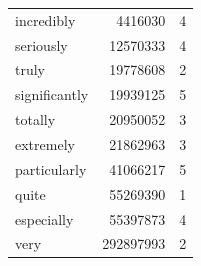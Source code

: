 \begin{table}[hbt]
\begin{center}
\begin{tabular}{lrc}
    incredibly & 4416030 & 4 \\
    seriously & 12570333 & 4 \\
    truly & 19778608 & 2 \\
    significantly & 19939125 & 5 \\
    totally & 20950052 & 3 \\
    extremely & 21862963 & 3 \\
    particularly & 41066217 & 5 \\
    quite & 55269390 & 1 \\
    especially & 55397873 & 4 \\
    very & 292897993 & 2 \\
   \hline
  \end{tabular}
 \end{center}
\end{table}



